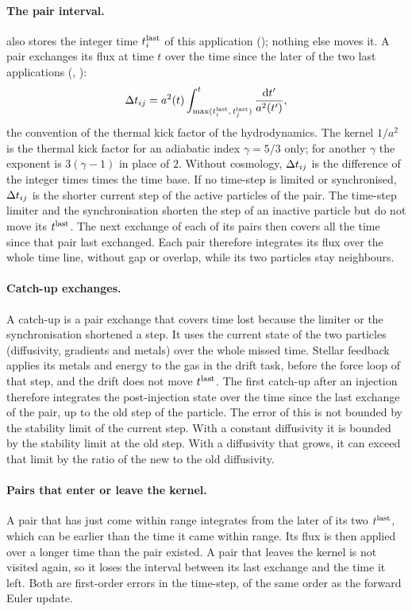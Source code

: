 \paragraph{The pair interval.}
 also stores the integer time $t_i^{\rm last}$
of this application (); nothing else moves it. A
pair exchanges its flux at time $t$ over the time since the later of the
two last applications (,
):
\begin{equation}
  \Delta t_{ij} = a^2(t) \int_{\max(t_i^{\rm last},\, t_j^{\rm last})}^{t}
             \frac{{\rm d}t'}{a^2(t')} ,
\end{equation}
the convention of the thermal kick factor of the hydrodynamics. The kernel
$1/a^2$ is the thermal kick factor for an adiabatic index $\gamma=5/3$
only; for another $\gamma$ the exponent is $3(\gamma-1)$ in place of $2$.
Without cosmology, $\Delta t_{ij}$ is the difference of the integer times times the
time base. If no time-step is limited or synchronised, $\Delta t_{ij}$ is the
shorter current step of the active particles of the pair. The time-step
limiter and the synchronisation shorten the step of an inactive particle
but do not move its $t^{\rm last}$. The next exchange of each of its pairs
then covers all the time since that pair last exchanged. Each pair
therefore integrates its flux over the whole time line, without gap or
overlap, while its two particles stay neighbours.

\paragraph{Catch-up exchanges.} A catch-up is a pair exchange that covers
time lost because the limiter or the synchronisation shortened a step. It
uses the current state of the two particles (diffusivity, gradients and
metals) over the whole missed time. Stellar feedback applies its metals
and energy to the gas in the drift task, before the force loop of that
step, and the drift does not move $t^{\rm last}$. The first catch-up after
an injection therefore integrates the post-injection state over the time
since the last exchange of the pair, up to the old step of the particle.
The error of this is not bounded by the stability limit of the current
step. With a constant diffusivity it is bounded by the stability limit at
the old step. With a diffusivity that grows, it can exceed that limit by
the ratio of the new to the old diffusivity.

\paragraph{Pairs that enter or leave the kernel.} A pair that has just
come within range integrates from the later of its two $t^{\rm last}$,
which can be earlier than the time it came within range. Its flux is then
applied over a longer time than the pair existed. A pair that leaves the
kernel is not visited again, so it loses the interval between its last
exchange and the time it left. Both are first-order errors in the
time-step, of the same order as the forward Euler update.

